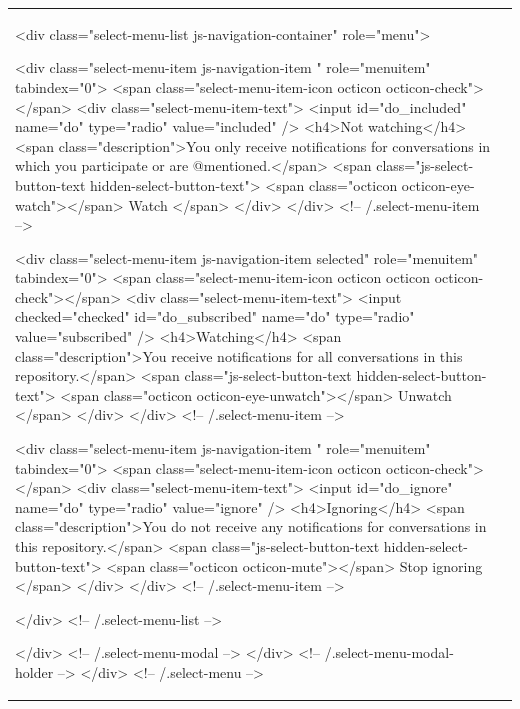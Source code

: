 \documentclass[a4paper,11pt,french]{article}
\begin{document}
\begin{tabular}{|m{8cm}|m{8cm}|}
          <div class="select-menu-list js-navigation-container" role="menu">

            <div class="select-menu-item js-navigation-item " role="menuitem" tabindex="0">
              <span class="select-menu-item-icon octicon octicon-check"></span>
              <div class="select-menu-item-text">
                <input id="do_included" name="do" type="radio" value="included" />
                <h4>Not watching</h4>
                <span class="description">You only receive notifications for conversations in which you participate or are @mentioned.</span>
                <span class="js-select-button-text hidden-select-button-text">
                  <span class="octicon octicon-eye-watch"></span>
                  Watch
                </span>
              </div>
            </div> <!-- /.select-menu-item -->

            <div class="select-menu-item js-navigation-item selected" role="menuitem" tabindex="0">
              <span class="select-menu-item-icon octicon octicon octicon-check"></span>
              <div class="select-menu-item-text">
                <input checked="checked" id="do_subscribed" name="do" type="radio" value="subscribed" />
                <h4>Watching</h4>
                <span class="description">You receive notifications for all conversations in this repository.</span>
                <span class="js-select-button-text hidden-select-button-text">
                  <span class="octicon octicon-eye-unwatch"></span>
                  Unwatch
                </span>
              </div>
            </div> <!-- /.select-menu-item -->

            <div class="select-menu-item js-navigation-item " role="menuitem" tabindex="0">
              <span class="select-menu-item-icon octicon octicon-check"></span>
              <div class="select-menu-item-text">
                <input id="do_ignore" name="do" type="radio" value="ignore" />
                <h4>Ignoring</h4>
                <span class="description">You do not receive any notifications for conversations in this repository.</span>
                <span class="js-select-button-text hidden-select-button-text">
                  <span class="octicon octicon-mute"></span>
                  Stop ignoring
                </span>
              </div>
            </div> <!-- /.select-menu-item -->

          </div> <!-- /.select-menu-list -->

        </div> <!-- /.select-menu-modal -->
      </div> <!-- /.select-menu-modal-holder -->
    </div> <!-- /.select-menu -->


\end{tabular}
\end{document}
